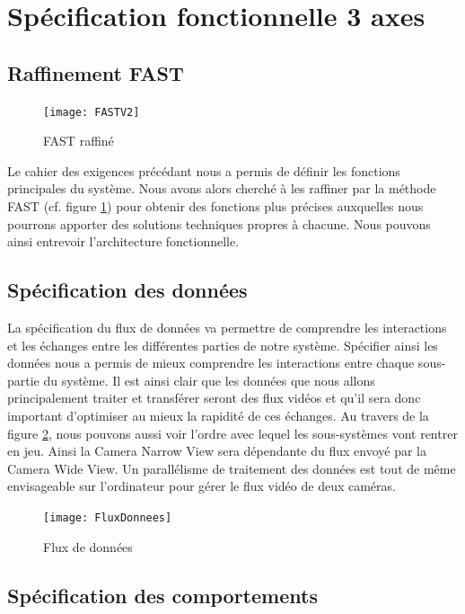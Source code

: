 \section{Spécification fonctionnelle  3 axes}

\subsection{Raffinement FAST}

\begin{figure}[H]
  \centering
  \texttt{[image: FASTV2]}
  \caption{FAST raffiné}
  \label{fig:FAST}
\end{figure}

Le cahier des exigences précédant nous a permis de définir les fonctions principales du système. Nous avons alors cherché à les raffiner par la méthode FAST (cf. figure \ref{fig:FAST}) pour obtenir des fonctions plus précises auxquelles nous pourrons apporter des solutions techniques propres à chacune. Nous pouvons ainsi entrevoir l'architecture fonctionnelle.

\subsection{Spécification des données}

La spécification du flux de données va permettre de comprendre les interactions et les échanges entre les différentes parties de notre système. Spécifier ainsi les données nous a permis de mieux comprendre les interactions entre chaque sous-partie du système. Il est ainsi clair que les données que nous allons principalement traiter et transférer seront des flux vidéos et qu’il sera donc important d’optimiser au mieux la rapidité de ces échanges.
Au travers de la figure \ref{fig:fluxDonnees}, nous pouvons aussi voir l’ordre avec lequel les sous-systèmes vont rentrer en jeu. Ainsi la Camera Narrow View sera dépendante du flux envoyé par la Camera Wide View. Un parallélisme de traitement des données est tout de même envisageable sur l'ordinateur pour gérer le flux vidéo de deux caméras.

\begin{figure}[h]
  \centering
  \texttt{[image: FluxDonnees]}
  \caption{Flux de données}
  \label{fig:fluxDonnees}
\end{figure}

\subsection{Spécification des comportements}

